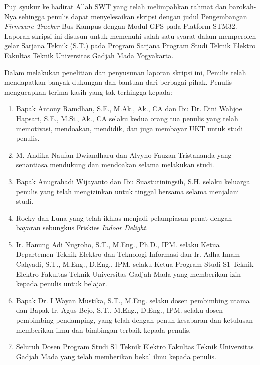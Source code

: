 Puji syukur ke hadirat Allah SWT yang telah melimpahkan rahmat dan barokah-Nya sehingga penulis dapat menyelesaikan skripsi dengan judul Pengembangan \textit{Firmware Tracker} Bus Kampus dengan Modul GPS pada Platform STM32. Laporan skripsi ini disusun untuk memenuhi salah satu syarat dalam memperoleh gelar Sarjana Teknik (S.T.) pada Program Sarjana Program Studi Teknik Elektro Fakultas Teknik Universitas Gadjah Mada Yogyakarta.


Dalam melakukan penelitian dan penyusunan laporan skripsi ini, Penulis telah mendapatkan banyak dukungan dan bantuan dari berbagai pihak. Penulis mengucapkan terima kasih yang tak terhingga kepada:

\begin{enumerate}
	\item Bapak Antony Ramdhan, S.E., M.Ak., Ak., CA dan Ibu Dr. Dini Wahjoe Hapsari, S.E., M.Si., Ak., CA selaku kedua orang tua penulis yang telah memotivasi, mendoakan, mendidik, dan juga membayar UKT untuk studi penulis.
	
	\item M. Andika Naufan Dwiandharu dan Alvyno Fauzan Tristananda yang senantiasa mendukung dan mendoakan selama melakukan studi.
	
	\item Bapak Anugrahadi Wijayanto dan Ibu Suastutiningsih, S.H. selaku keluarga penulis  yang telah mengizinkan untuk tinggal bersama selama menjalani studi.
	
	\item Rocky dan Luna yang telah ikhlas menjadi pelampiasan penat dengan bayaran sebungkus Friskies \textit{Indoor Delight}.
	
	\item Ir. Hanung Adi Nugroho, S.T., M.Eng., Ph.D., IPM. selaku Ketua Departemen Teknik Elektro dan Teknologi Informasi dan Ir. Adha Imam Cahyadi, S.T., M.Eng., D.Eng., IPM. selaku Ketua Program Studi S1 Teknik Elektro Fakultas Teknik Universitas Gadjah Mada yang memberikan izin kepada penulis untuk belajar.
		
	\item Bapak Dr. I Wayan Mustika, S.T., M.Eng. selaku dosen pembimbing utama dan Bapak Ir. Agus Bejo, S.T., M.Eng., D.Eng., IPM. selaku dosen pembimbing pendamping, yang telah dengan penuh kesabaran dan ketulusan memberikan ilmu dan bimbingan terbaik kepada penulis.
	
	\item Seluruh Dosen Program Studi S1 Teknik Elektro Fakultas Teknik Universitas Gadjah Mada yang telah memberikan bekal ilmu kepada penulis.
	

\end{enumerate}
